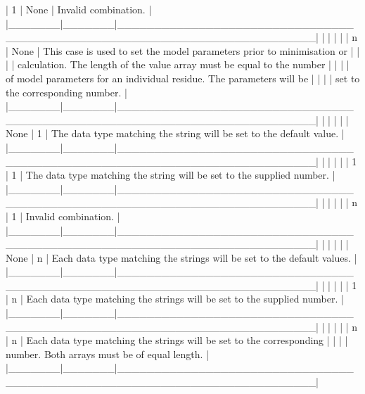 |   1   | None  | Invalid combination.                                                     |
|\_\_\_\_\_\_\_|\_\_\_\_\_\_\_|\_\_\_\_\_\_\_\_\_\_\_\_\_\_\_\_\_\_\_\_\_\_\_\_\_\_\_\_\_\_\_\_\_\_\_\_\_\_\_\_\_\_\_\_\_\_\_\_\_\_\_\_\_\_\_\_\_\_\_\_\_\_\_\_\_\_\_\_\_\_\_\_\_\_|
|       |       |                                                                          |
|   n   | None  | This case is used to set the model parameters prior to minimisation or   |
|       |       | calculation.  The length of the value array must be equal to the number  |
|       |       | of model parameters for an individual residue.  The parameters will be   |
|       |       | set to the corresponding number.                                         |
|\_\_\_\_\_\_\_|\_\_\_\_\_\_\_|\_\_\_\_\_\_\_\_\_\_\_\_\_\_\_\_\_\_\_\_\_\_\_\_\_\_\_\_\_\_\_\_\_\_\_\_\_\_\_\_\_\_\_\_\_\_\_\_\_\_\_\_\_\_\_\_\_\_\_\_\_\_\_\_\_\_\_\_\_\_\_\_\_\_|
|       |       |                                                                          |
| None  |   1   | The data type matching the string will be set to the default value.      |
|\_\_\_\_\_\_\_|\_\_\_\_\_\_\_|\_\_\_\_\_\_\_\_\_\_\_\_\_\_\_\_\_\_\_\_\_\_\_\_\_\_\_\_\_\_\_\_\_\_\_\_\_\_\_\_\_\_\_\_\_\_\_\_\_\_\_\_\_\_\_\_\_\_\_\_\_\_\_\_\_\_\_\_\_\_\_\_\_\_|
|       |       |                                                                          |
|   1   |   1   | The data type matching the string will be set to the supplied number.    |
|\_\_\_\_\_\_\_|\_\_\_\_\_\_\_|\_\_\_\_\_\_\_\_\_\_\_\_\_\_\_\_\_\_\_\_\_\_\_\_\_\_\_\_\_\_\_\_\_\_\_\_\_\_\_\_\_\_\_\_\_\_\_\_\_\_\_\_\_\_\_\_\_\_\_\_\_\_\_\_\_\_\_\_\_\_\_\_\_\_|
|       |       |                                                                          |
|   n   |   1   | Invalid combination.                                                     |
|\_\_\_\_\_\_\_|\_\_\_\_\_\_\_|\_\_\_\_\_\_\_\_\_\_\_\_\_\_\_\_\_\_\_\_\_\_\_\_\_\_\_\_\_\_\_\_\_\_\_\_\_\_\_\_\_\_\_\_\_\_\_\_\_\_\_\_\_\_\_\_\_\_\_\_\_\_\_\_\_\_\_\_\_\_\_\_\_\_|
|       |       |                                                                          |
| None  |   n   | Each data type matching the strings will be set to the default values.   |
|\_\_\_\_\_\_\_|\_\_\_\_\_\_\_|\_\_\_\_\_\_\_\_\_\_\_\_\_\_\_\_\_\_\_\_\_\_\_\_\_\_\_\_\_\_\_\_\_\_\_\_\_\_\_\_\_\_\_\_\_\_\_\_\_\_\_\_\_\_\_\_\_\_\_\_\_\_\_\_\_\_\_\_\_\_\_\_\_\_|
|       |       |                                                                          |
|   1   |   n   | Each data type matching the strings will be set to the supplied number.  |
|\_\_\_\_\_\_\_|\_\_\_\_\_\_\_|\_\_\_\_\_\_\_\_\_\_\_\_\_\_\_\_\_\_\_\_\_\_\_\_\_\_\_\_\_\_\_\_\_\_\_\_\_\_\_\_\_\_\_\_\_\_\_\_\_\_\_\_\_\_\_\_\_\_\_\_\_\_\_\_\_\_\_\_\_\_\_\_\_\_|
|       |       |                                                                          |
|   n   |   n   | Each data type matching the strings will be set to the corresponding     |
|       |       | number.  Both arrays must be of equal length.                            |
|\_\_\_\_\_\_\_|\_\_\_\_\_\_\_|\_\_\_\_\_\_\_\_\_\_\_\_\_\_\_\_\_\_\_\_\_\_\_\_\_\_\_\_\_\_\_\_\_\_\_\_\_\_\_\_\_\_\_\_\_\_\_\_\_\_\_\_\_\_\_\_\_\_\_\_\_\_\_\_\_\_\_\_\_\_\_\_\_\_|



